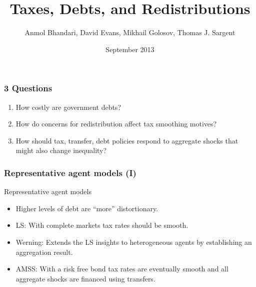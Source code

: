 \documentclass{beamer}
\title {Taxes, Debts,  and Redistributions}
\author{Anmol Bhandari, David Evans, Mikhail Golosov, Thomas J. Sargent}
\date{September 2013}
\begin{document}
%
\begin{frame}
\titlepage

\end{frame}


\begin{frame}
\frametitle{3 Questions}

\begin{enumerate}
 \item How costly are government debts?
 \vspace{2mm} 
 \item How do concerns for redistribution affect tax smoothing motives?
\vspace{2mm} 
 \item How should tax, transfer, debt policies respond to aggregate shocks that might also change inequality?
\end{enumerate}

\end{frame}


\begin{frame}
\frametitle{Representative agent models (I)}
Representative agent models

\begin{itemize}
\item Higher levels of debt are ``more'' distortionary. 
 \vspace{2mm} 
 \item LS: With complete markets tax rates should be smooth.  
 \vspace{2mm} 
 \item Werning: Extends the LS insights to heterogeneous agents by establishing an aggregation result.
 \vspace{2mm} 
 \item AMSS: With a risk free bond tax rates are eventually smooth and all aggregate shocks are financed using transfers.
\end{itemize}



\end{frame}
\end{document}
